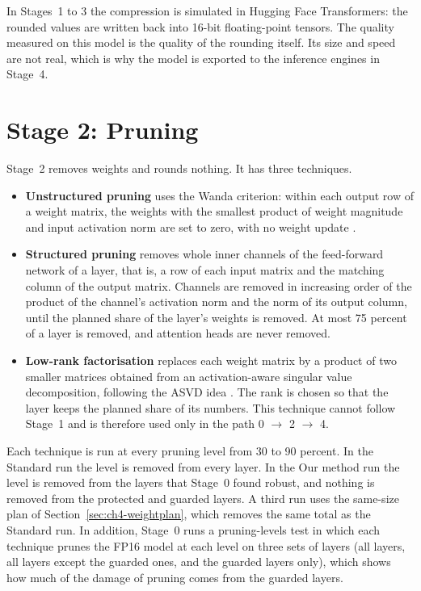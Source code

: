 In Stages~1 to 3 the compression is simulated in Hugging Face Transformers: the rounded values are written back into 16-bit floating-point tensors. The quality measured on this model is the quality of the rounding itself. Its size and speed are not real, which is why the model is exported to the inference engines in Stage~4.

\section{Stage 2: Pruning}
\label{sec:ch4-stage2}

Stage~2 removes weights and rounds nothing. It has three techniques.

\begin{itemize}
  \item \textbf{Unstructured pruning} uses the Wanda criterion: within each output row of a weight matrix, the weights with the smallest product of weight magnitude and input activation norm are set to zero, with no weight update \cite{sun2024wanda}.
  \item \textbf{Structured pruning} removes whole inner channels of the feed-forward network of a layer, that is, a row of each input matrix and the matching column of the output matrix. Channels are removed in increasing order of the product of the channel's activation norm and the norm of its output column, until the planned share of the layer's weights is removed. At most 75 percent of a layer is removed, and attention heads are never removed.
  \item \textbf{Low-rank factorisation} replaces each weight matrix by a product of two smaller matrices obtained from an activation-aware singular value decomposition, following the ASVD idea \cite{yuan2025asvd}. The rank is chosen so that the layer keeps the planned share of its numbers. This technique cannot follow Stage~1 and is therefore used only in the path 0 $\rightarrow$ 2 $\rightarrow$ 4.
\end{itemize}

Each technique is run at every pruning level from 30 to 90 percent. In the Standard run the level is removed from every layer. In the Our method run the level is removed from the layers that Stage~0 found robust, and nothing is removed from the protected and guarded layers. A third run uses the same-size plan of Section~\ref{sec:ch4-weightplan}, which removes the same total as the Standard run. In addition, Stage~0 runs a pruning-levels test in which each technique prunes the FP16 model at each level on three sets of layers (all layers, all layers except the guarded ones, and the guarded layers only), which shows how much of the damage of pruning comes from the guarded layers.

